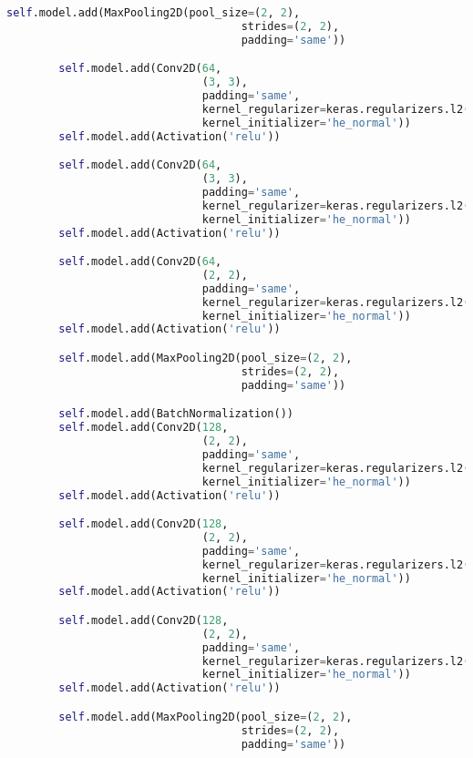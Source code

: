 \begin{appendices}
\begin{lstlisting}[language=python]
        self.model.add(MaxPooling2D(pool_size=(2, 2),
                                    strides=(2, 2),
                                    padding='same'))

        self.model.add(Conv2D(64,
                              (3, 3),
                              padding='same',
                              kernel_regularizer=keras.regularizers.l2(self.weight_decay),
                              kernel_initializer='he_normal'))
        self.model.add(Activation('relu'))

        self.model.add(Conv2D(64,
                              (3, 3),
                              padding='same',
                              kernel_regularizer=keras.regularizers.l2(self.weight_decay),
                              kernel_initializer='he_normal'))
        self.model.add(Activation('relu'))

        self.model.add(Conv2D(64,
                              (2, 2),
                              padding='same',
                              kernel_regularizer=keras.regularizers.l2(self.weight_decay),
                              kernel_initializer='he_normal'))
        self.model.add(Activation('relu'))

        self.model.add(MaxPooling2D(pool_size=(2, 2),
                                    strides=(2, 2),
                                    padding='same'))

        self.model.add(BatchNormalization())
        self.model.add(Conv2D(128,
                              (2, 2),
                              padding='same',
                              kernel_regularizer=keras.regularizers.l2(self.weight_decay),
                              kernel_initializer='he_normal'))
        self.model.add(Activation('relu'))

        self.model.add(Conv2D(128,
                              (2, 2),
                              padding='same',
                              kernel_regularizer=keras.regularizers.l2(self.weight_decay),
                              kernel_initializer='he_normal'))
        self.model.add(Activation('relu'))

        self.model.add(Conv2D(128,
                              (2, 2),
                              padding='same',
                              kernel_regularizer=keras.regularizers.l2(self.weight_decay),
                              kernel_initializer='he_normal'))
        self.model.add(Activation('relu'))

        self.model.add(MaxPooling2D(pool_size=(2, 2),
                                    strides=(2, 2),
                                    padding='same'))


\end{lstlisting}
\end{appendices}
